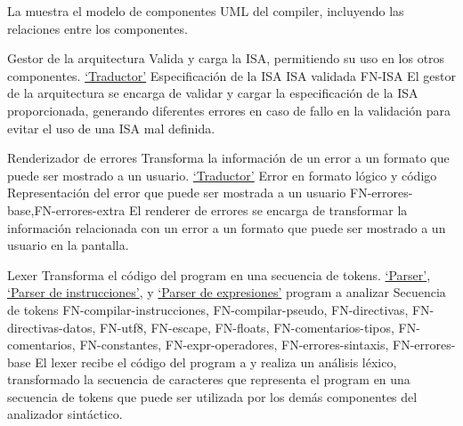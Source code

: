 La  muestra el modelo de componentes UML
\parencite{UMLSpec} del \gls{compiler}, incluyendo las relaciones entre los
componentes.


\printcomptemplate

\newcommand{\componentref}[1]{\hyperref[req:#1]{`#1'}}

\begin{component}{Gestor de la arquitectura}
    {Valida y carga la \gls{ISA}, permitiendo su uso en los otros componentes.} %
    {\componentref{Traductor}} %
    {Especificación de la \gls{ISA}} %
    {\gls{ISA} validada} %
    {FN-ISA} %
    El gestor de la arquitectura se encarga de validar y cargar la
    especificación de la \gls{ISA} proporcionada, generando diferentes errores
    en caso de fallo en la validación para evitar el uso de una \gls{ISA} mal
    definida.
\end{component}

\begin{component}{Renderizador de errores}
    {Transforma la información de un error a un formato que puede ser mostrado a un usuario.} %
    {\componentref{Traductor}} %
    {Error en formato lógico y código } %
    {Representación del error que puede ser mostrada a un usuario} %
    {FN-errores-base,FN-errores-extra} %
    El \gls{renderer} de errores se encarga de transformar la información
    relacionada con un error a un formato que puede ser mostrado a un usuario en
    la pantalla.
\end{component}

\begin{component}{Lexer}
    {Transforma el código del \gls{program} en una secuencia de \glspl{token}.} %
    {\componentref{Parser}, \componentref{Parser de instrucciones}, y \componentref{Parser de expresiones}} %
    {\Gls{program} a analizar} %
    {Secuencia de \glspl{token}} %
    {FN-compilar-instrucciones, FN-compilar-pseudo, FN-directivas,
    FN-directivas-datos, FN-utf8, FN-escape, FN-floats, FN-comentarios-tipos,
    FN-comentarios, FN-constantes, FN-expr-operadores, FN-errores-sintaxis,
    FN-errores-base} %
    El lexer recibe el código del \gls{program} a
     y realiza un análisis léxico, transformado
    la secuencia de caracteres que representa el \gls{program} en una secuencia
    de \glspl{token} que puede ser utilizada por los demás componentes del
    analizador sintáctico.
\end{component}

